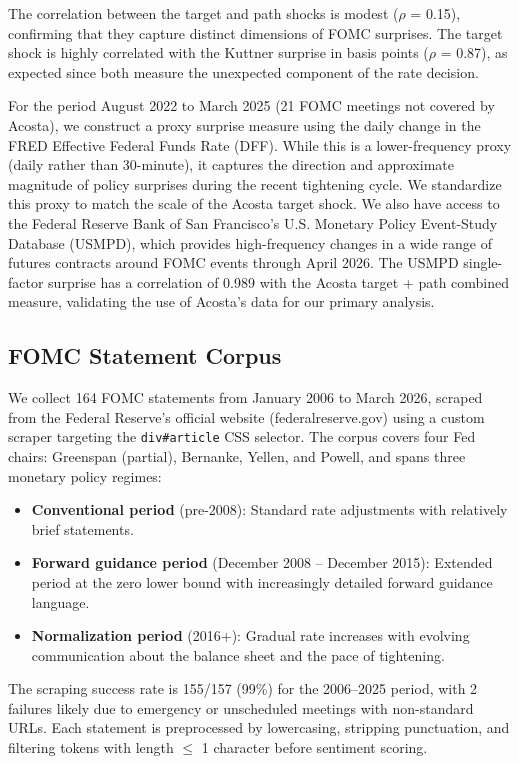 \documentclass[12pt]{article}
\begin{document}
The correlation between the target and path shocks is modest ($\rho$ = 0.15), confirming that they capture distinct dimensions of FOMC surprises. The target shock is highly correlated with the Kuttner surprise in basis points ($\rho$ = 0.87), as expected since both measure the unexpected component of the rate decision.

For the period August 2022 to March 2025 (21 FOMC meetings not covered by Acosta), we construct a proxy surprise measure using the daily change in the FRED Effective Federal Funds Rate (DFF). While this is a lower-frequency proxy (daily rather than 30-minute), it captures the direction and approximate magnitude of policy surprises during the recent tightening cycle. We standardize this proxy to match the scale of the Acosta target shock. We also have access to the Federal Reserve Bank of San Francisco's U.S. Monetary Policy Event-Study Database (USMPD), which provides high-frequency changes in a wide range of futures contracts around FOMC events through April 2026. The USMPD single-factor surprise has a correlation of 0.989 with the Acosta target + path combined measure, validating the use of Acosta's data for our primary analysis.

\subsection{FOMC Statement Corpus}

We collect 164 FOMC statements from January 2006 to March 2026, scraped from the Federal Reserve's official website (federalreserve.gov) using a custom scraper targeting the \texttt{div\#article} CSS selector. The corpus covers four Fed chairs: Greenspan (partial), Bernanke, Yellen, and Powell, and spans three monetary policy regimes:

\begin{itemize}
\item \textbf{Conventional period} (pre-2008): Standard rate adjustments with relatively brief statements.
\item \textbf{Forward guidance period} (December 2008 -- December 2015): Extended period at the zero lower bound with increasingly detailed forward guidance language.
\item \textbf{Normalization period} (2016+): Gradual rate increases with evolving communication about the balance sheet and the pace of tightening.
\end{itemize}

The scraping success rate is 155/157 (99\%) for the 2006--2025 period, with 2 failures likely due to emergency or unscheduled meetings with non-standard URLs. Each statement is preprocessed by lowercasing, stripping punctuation, and filtering tokens with length $\leq$ 1 character before sentiment scoring.
\end{document}
